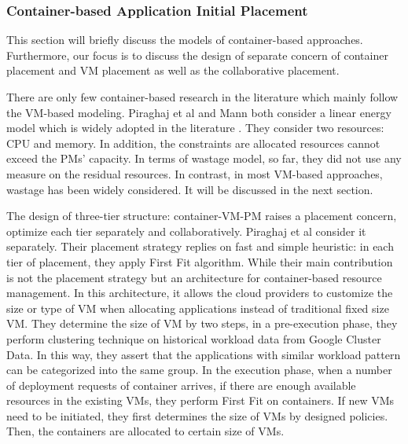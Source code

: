 \subsubsection{Container-based Application Initial Placement}
\label{container-based-placement}

This section will briefly discuss the models of container-based approaches. Furthermore, our focus is to discuss the design of separate concern of container placement and VM placement as well as the collaborative placement. 

There are only few container-based research in the literature which mainly follow the VM-based modeling. Piraghaj et al \cite{Piraghaj:2016bw} and Mann \cite{Mann:2016hx} both consider a linear energy model which is widely adopted in the literature \cite{Xavier:2017jl}. They consider two resources: CPU and memory. In addition, the constraints are allocated resources cannot exceed the PMs' capacity. In terms of wastage model, so far, they did not use any measure on the residual resources. In contrast, in most VM-based approaches, wastage has been widely considered. It will be discussed in the next section.  

The design of three-tier structure: container-VM-PM raises a placement concern, optimize each tier separately and collaboratively.
Piraghaj et al \cite{Piraghaj:2016bw} consider it separately. Their placement strategy replies on fast and simple heuristic: in each tier of placement, they apply First Fit algorithm. While their main contribution is not the placement strategy but an architecture for container-based resource management. In this architecture, it allows the cloud providers to customize the size or type of VM when allocating applications instead of traditional fixed size VM. They determine the size of VM by two steps, in a pre-execution phase, they perform clustering technique on historical workload data from Google Cluster Data. In this way, they assert that the applications with similar workload pattern can be categorized into the same group. In the execution phase, when a number of deployment requests of container arrives, if there are enough available resources in the existing VMs, they perform First Fit on containers. If new VMs need to be initiated, they first determines the size of VMs by designed policies. Then, the containers are allocated to certain size of VMs. 


